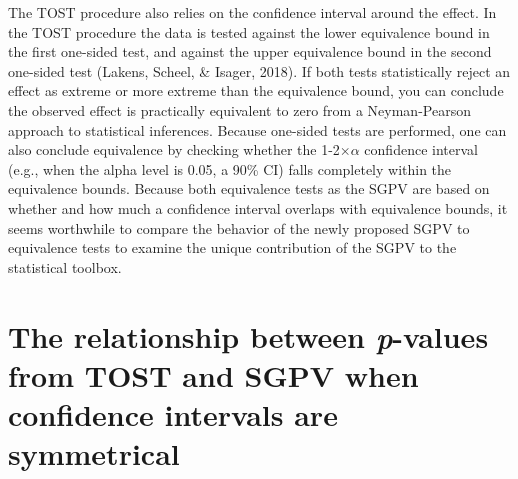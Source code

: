 \documentclass[floatsintext,man]{apa6}
\theoremstyle{definition}
\theoremstyle{definition}
\theoremstyle{definition}
\theoremstyle{remark}
\begin{document}
The TOST procedure also relies on the confidence interval around the
effect. In the TOST procedure the data is tested against the lower
equivalence bound in the first one-sided test, and against the upper
equivalence bound in the second one-sided test (Lakens, Scheel, \&
Isager, 2018). If both tests statistically reject an effect as extreme
or more extreme than the equivalence bound, you can conclude the
observed effect is practically equivalent to zero from a Neyman-Pearson
approach to statistical inferences. Because one-sided tests are
performed, one can also conclude equivalence by checking whether the
1-2\(\times\)\(\alpha\) confidence interval (e.g., when the alpha level
is 0.05, a 90\% CI) falls completely within the equivalence bounds.
Because both equivalence tests as the SGPV are based on whether and how
much a confidence interval overlaps with equivalence bounds, it seems
worthwhile to compare the behavior of the newly proposed SGPV to
equivalence tests to examine the unique contribution of the SGPV to the
statistical toolbox.

\section{\texorpdfstring{The relationship between \emph{p}-values from
TOST and SGPV when confidence intervals are
symmetrical}{The relationship between p-values from TOST and SGPV when confidence intervals are symmetrical}}\label{the-relationship-between-p-values-from-tost-and-sgpv-when-confidence-intervals-are-symmetrical}
\end{document}
